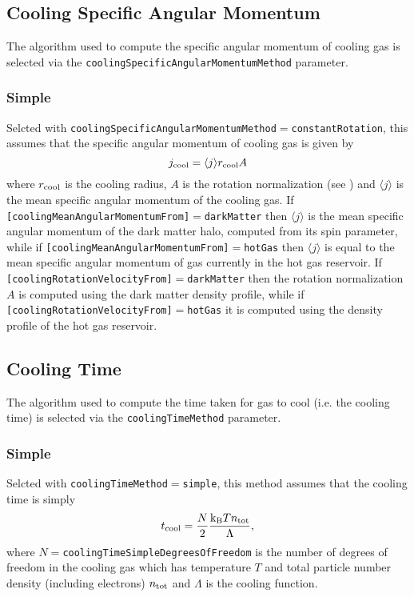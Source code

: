 \subsection{Cooling Specific Angular Momentum}

The algorithm used to compute the specific angular momentum of cooling gas is selected via the {\tt coolingSpecificAngularMomentumMethod} parameter.

\subsubsection{Simple}

Selcted with {\tt coolingSpecificAngularMomentumMethod}$=${\tt constantRotation}, this assumes that the specific angular momentum of cooling gas is given by
\begin{equation}
 j_{\rm cool} = \langle j \rangle r_{\rm cool} A
\end{equation}
where $r_{\rm cool}$ is the cooling radius, $A$ is the rotation normalization (see ) and $\langle j \rangle$ is the mean specific angular momentum of the cooling gas. 
If {\tt [coolingMeanAngularMomentumFrom]}$=${\tt darkMatter} then $\langle j \rangle$ is the mean specific angular momentum of the dark matter halo, computed from its spin parameter, while if {\tt [coolingMeanAngularMomentumFrom]}$=${\tt hotGas} then $\langle j \rangle$ is equal to the mean specific angular momentum of gas currently in the hot gas reservoir. If {\tt [coolingRotationVelocityFrom]}$=${\tt darkMatter} then the rotation normalization $A$ is computed using the dark matter density profile, while if {\tt [coolingRotationVelocityFrom]}$=${\tt hotGas} it is computed using the density profile of the hot gas reservoir.

\subsection{Cooling Time}\label{sec:CoolingTime}

The algorithm used to compute the time taken for gas to cool (i.e. the cooling time) is selected via the {\tt coolingTimeMethod} parameter.

\subsubsection{Simple}

Selcted with {\tt coolingTimeMethod}$=${\tt simple}, this method assumes that the cooling time is simply
\begin{equation}
 t_{\rm cool} = {N \over 2} {{\rm k}_{\rm B} T n_{\rm tot} \over \Lambda},
\end{equation}
where $N=${\tt coolingTimeSimpleDegreesOfFreedom} is the number of degrees of freedom in the cooling gas which has temperature $T$ and total particle number density (including electrons) $n_{\rm tot}$ and $\Lambda$ is the cooling function.

